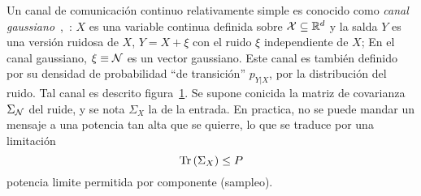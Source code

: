 
\label{sec:SZ:Canalgaussiano}

Un canal de  comunicaci\'on continuo relativamente simple es  conocido como {\it
  canal  gaussiano}~\cite[Sec.~25]{Sha48},~\cite{CovTho06,  Rio07}:  $X$ es  una
variable continua  definida sobre $\mathcal{X} \subseteq  \mathbb{R}^d$ y la salda  $Y$ es una
versi\'on ruidosa de $X$, \ie $Y =  X + \xi$ con el ruido $\xi$ independiente de
$X$; En  el canal gaussiano, $\xi  \equiv \mathcal{N}$ es un  vector gaussiano.  Este
canal es tambi\'en definido por  su densidad de probabilidad ``de transici\'on''
$p_{Y|X}$,  \ie  por  la  distribuci\'on  del  ruido.   Tal  canal  es  descrito
figura~\ref{fig:SZ:CanalGaussiano}.  Se supone  conicida la matriz de covarianza
$\Sigma_{\mathcal{N}}$ del ruide,  y se nota $\Sigma_X$ la de  la entrada. En practica,
no se puede mandar un mensaje a una  potencia tan alta que se quierre, lo que se
traduce  por  una limitaci\'on
%
\[
\operatorname{Tr}\left(  \Sigma_X  \right) \le  P
\]
%
potencia limite permitida por componente (sampleo).

\begin{figure}[h!]
\begin{center}\end{center}
\label{fig:SZ:CanalGaussiano}
\end{figure}


